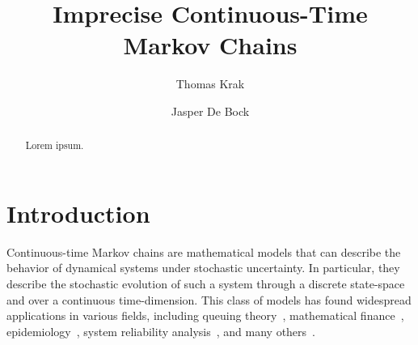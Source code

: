 \documentclass[10pt,a4paper]{paper}
\title{Imprecise Continuous-Time Markov Chains}
\author{Thomas Krak \and Jasper De Bock}
\theoremstyle{definition}
\begin{document}


\date{}
\maketitle

\begin{abstract}
Lorem ipsum.
\end{abstract}

\section{Introduction}\label{sec:introduction}

Continuous-time Markov chains are mathematical models that can describe the behavior of dynamical systems under stochastic uncertainty. In particular, they describe the stochastic evolution of such a system through a discrete state-space and over a continuous time-dimension. This class of models has found widespread applications in various fields, including queuing theory~\cite{asmussen2008applied,bolch2006queueing}, mathematical finance~\cite{elliott2013default, rolski2009stochastic,sass2004optimizing}, epidemiology~\cite{ duffy1995estimation,jackson2003multistate, lemey2009reconstructing}, system reliability analysis~\cite{besnard2010approach,gokhale2004analysis, wang2007reliability}, and many others~\cite{yin2012continuous}.
\end{document}
